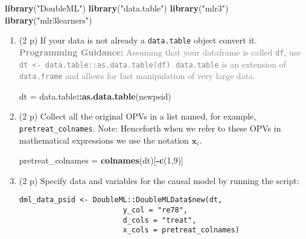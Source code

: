 \documentclass[
]{article}
\newenvironment{Shaded}{\begin{snugshade}}{\end{snugshade}}
\newcommand{\DecValTok}[1]{\textcolor[rgb]{0.00,0.00,0.81}{#1}}
\newcommand{\FunctionTok}[1]{\textcolor[rgb]{0.13,0.29,0.53}{\textbf{#1}}}
\newcommand{\NormalTok}[1]{#1}
\newcommand{\OtherTok}[1]{\textcolor[rgb]{0.56,0.35,0.01}{#1}}
\newcommand{\SpecialCharTok}[1]{\textcolor[rgb]{0.81,0.36,0.00}{\textbf{#1}}}
\newcommand{\StringTok}[1]{\textcolor[rgb]{0.31,0.60,0.02}{#1}}
\begin{document}
\begin{enumerate}
\begin{Shaded}
\begin{Highlighting}[]
\FunctionTok{library}\NormalTok{(}\StringTok{"DoubleML"}\NormalTok{)}
\FunctionTok{library}\NormalTok{(}\StringTok{"data.table"}\NormalTok{)}
\FunctionTok{library}\NormalTok{(}\StringTok{"mlr3"}\NormalTok{)}
\FunctionTok{library}\NormalTok{(}\StringTok{"mlr3learners"}\NormalTok{)}
\end{Highlighting}
\end{Shaded}

  \begin{enumerate}
  \def\labelenumii{\alph{enumii}.}
  \setcounter{enumii}{1}
  \item
    (2 p) If your data is not already a \texttt{data.table} object
    convert it.
    \textcolor{gray}{\textbf{Programming Guidance:} Assuming that your dataframe is called \texttt{df}, use \texttt{dt <- data.table::as.data.table(df)}. \texttt{data.table} is an extension of \texttt{data.frame} and allows for fast manipulation of very large data.}

\begin{Shaded}
\begin{Highlighting}[]
\NormalTok{dt }\OtherTok{=}\NormalTok{ data.table}\SpecialCharTok{::}\FunctionTok{as.data.table}\NormalTok{(nswpsid)}
\end{Highlighting}
\end{Shaded}
  \item
    (2 p) Collect all the original OPVs in a list named, for example,
    \texttt{pretreat\_colnames}. Note: Henceforth when we refer to these
    OPVs in mathematical expressions we use the notation
    \(\mathbf{x}_{i}\).

\begin{Shaded}
\begin{Highlighting}[]
\NormalTok{pretreat\_colnames }\OtherTok{=} \FunctionTok{colnames}\NormalTok{(dt)[}\SpecialCharTok{{-}}\FunctionTok{c}\NormalTok{(}\DecValTok{1}\NormalTok{,}\DecValTok{9}\NormalTok{)] }
\end{Highlighting}
\end{Shaded}
  \item
    (2 p) Specify data and variables for the causal model by running the
    script:\label{item:dml-data}

\begin{verbatim}
dml_data_psid <- DoubleML::DoubleMLData$new(dt,
                        y_col = "re78",
                        d_cols = "treat",
                        x_cols = pretreat_colnames)
\end{verbatim}


\end{enumerate}
\end{enumerate}
\end{document}
